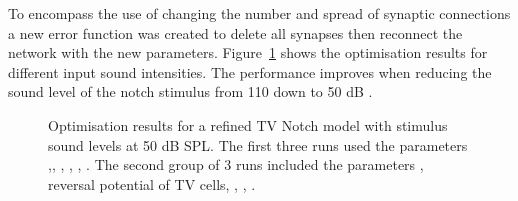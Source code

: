 

To encompass the use of changing the number and spread of synaptic connections a
new error function was created to delete all synapses then reconnect the network
with the new parameters. Figure~\ref{fig:TV_result_Run2_50} shows the
optimisation results for different input sound intensities.  The performance
improves when reducing the sound level of the notch stimulus from 110 down to 50
dB \SPL\@.  

\smallskip{}

\begin{figure}[thb]
  \centering
  \caption{Optimisation results for a refined TV Notch model with stimulus sound
    levels at 50 dB SPL\@.  The first three runs used the parameters
    \nDSTV,\wDSTV, \nLSRTV, \nHSRTV, \wLSRTV, \wHSRTV\@. The second group of 3
    runs included the parameters \sDSTV, reversal potential of TV cells, \oDSTV,
    \nDSTV, \wDSTV.}
  \label{fig:TV_result_Run2_50}
\end{figure}



